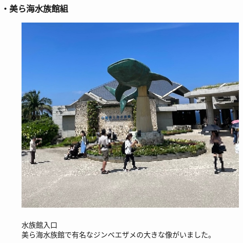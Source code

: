 \documentclass[../main]{subfiles}
\begin{document}
\subsubsection*{・美ら海水族館組}
\begin{figure}[H]
  \begin{minipage}[b]{0.48\columnwidth}
    \centering
    \includegraphics[width=\columnwidth]{figure/tyuraumi_entrance.jpg}
  \end{minipage}
  \hspace{0.04\columnwidth} %
  \begin{minipage}[b]{0.48\columnwidth}
    \caption{\\
    水族館入口\\
    美ら海水族館で有名なジンベエザメの大きな像がいました。
    }
  \end{minipage}
\end{figure}
\end{document}
